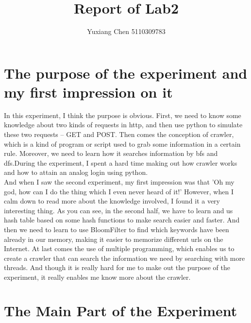 \documentclass{article}
\author{Yuxiang Chen 5110309783}
\title{Report of Lab2}
\begin{document}
\maketitle
\tableofcontents
\section{The purpose of the experiment and my first impression on it}
In this experiment, I think the purpose is obvious. First, we need to know some knowledge about two kinds of requests in http, and then use python to simulate these two requests -- GET and POST. Then comes the conception of crawler, which is a kind of program or script used to grab some information in a certain rule. Moreover, we need to learn how it searches information by bfs and dfs.During the experiment, I spent a hard time making out how crawler works and how to attain an analog login using python. \\
And when I saw the second experiment, my first impression was that 'Oh my god, how can I do the thing which I even never heard of it!' However, when I calm down to read more about the knowledge involved, I found it a very interesting thing. As you can see, in the second half, we have to learn and us hash table based on some hash functions to make search easier and faster. And then we need to learn to use BloomFilter to find which keywords have been already in our memory, making it easier to memorize different urls on the Internet. At last comes the use of multiple programming, which enables us to create a crawler that can search the information we need by searching with more threads.
And though it is really hard for me to make out the purpose of the experiment, it really enables me know more about the crawler.
\section{The Main Part of the Experiment}
\end{document}
